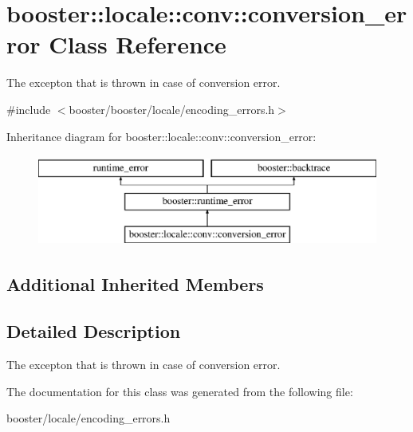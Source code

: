 \section{booster\+:\+:locale\+:\+:conv\+:\+:conversion\+\_\+error Class Reference}
\label{classbooster_1_1locale_1_1conv_1_1conversion__error}


The excepton that is thrown in case of conversion error.  




{\ttfamily \#include $<$booster/booster/locale/encoding\+\_\+errors.\+h$>$}

Inheritance diagram for booster\+:\+:locale\+:\+:conv\+:\+:conversion\+\_\+error\+:\begin{figure}[H]
\begin{center}
\leavevmode
\includegraphics[height=3.000000cm]{classbooster_1_1locale_1_1conv_1_1conversion__error}
\end{center}
\end{figure}
\subsection*{Additional Inherited Members}


\subsection{Detailed Description}
The excepton that is thrown in case of conversion error. 

The documentation for this class was generated from the following file\+:\begin{DoxyCompactItemize}
\item 
booster/locale/encoding\+\_\+errors.\+h\end{DoxyCompactItemize}
